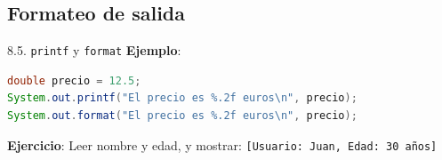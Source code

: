 \documentclass{beamer}
\begin{document}
\subsection{Formateo de salida}

\begin{frame}[fragile]{8.5. \texttt{printf} y \texttt{format}}
\textbf{Ejemplo}:
\begin{lstlisting}[language=Java]
double precio = 12.5;
System.out.printf("El precio es %.2f euros\n", precio);
System.out.format("El precio es %.2f euros\n", precio);
\end{lstlisting}

\textbf{Ejercicio}:  
Leer nombre y edad, y mostrar:  
\texttt{[Usuario: Juan, Edad: 30 años]}
\end{frame}
\end{document}
